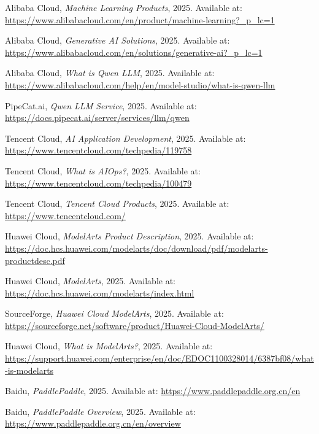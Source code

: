 \documentclass[11pt, a4paper, oneside]{article}
\begin{document}
\begin{thebibliography}{99}
    Alibaba Cloud, \textit{Machine Learning Products}, 2025. Available at: \url{https://www.alibabacloud.com/en/product/machine-learning?_p_lc=1}

    Alibaba Cloud, \textit{Generative AI Solutions}, 2025. Available at: \url{https://www.alibabacloud.com/en/solutions/generative-ai?_p_lc=1}

    Alibaba Cloud, \textit{What is Qwen LLM}, 2025. Available at: \url{https://www.alibabacloud.com/help/en/model-studio/what-is-qwen-llm}

    PipeCat.ai, \textit{Qwen LLM Service}, 2025. Available at: \url{https://docs.pipecat.ai/server/services/llm/qwen}

    Tencent Cloud, \textit{AI Application Development}, 2025. Available at: \url{https://www.tencentcloud.com/techpedia/119758}

    Tencent Cloud, \textit{What is AIOps?}, 2025. Available at: \url{https://www.tencentcloud.com/techpedia/100479}

    Tencent Cloud, \textit{Tencent Cloud Products}, 2025. Available at: \url{https://www.tencentcloud.com/}

    Huawei Cloud, \textit{ModelArts Product Description}, 2025. Available at: \url{https://doc.hcs.huawei.com/modelarts/doc/download/pdf/modelarts-productdesc.pdf}

    Huawei Cloud, \textit{ModelArts}, 2025. Available at: \url{https://doc.hcs.huawei.com/modelarts/index.html}

    SourceForge, \textit{Huawei Cloud ModelArts}, 2025. Available at: \url{https://sourceforge.net/software/product/Huawei-Cloud-ModelArts/}

    Huawei Cloud, \textit{What is ModelArts?}, 2025. Available at: \url{https://support.huawei.com/enterprise/en/doc/EDOC1100328014/6387bf08/what-is-modelarts}

    Baidu, \textit{PaddlePaddle}, 2025. Available at: \url{https://www.paddlepaddle.org.cn/en}

    Baidu, \textit{PaddlePaddle Overview}, 2025. Available at: \url{https://www.paddlepaddle.org.cn/en/overview}


\end{thebibliography}
\end{document}

